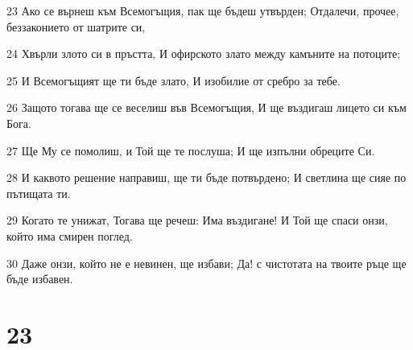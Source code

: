 \par 23 Ако се върнеш към Всемогъщия, пак ще бъдеш утвърден; Отдалечи, прочее, беззаконието от шатрите си,
\par 24 Хвърли злото си в пръстта, И офирското злато между камъните на потоците;
\par 25 И Всемогъщият ще ти бъде злато, И изобилие от сребро за тебе.
\par 26 Защото тогава ще се веселиш във Всемогъщия, И ще въздигаш лицето си към Бога.
\par 27 Ще Му се помолиш, и Той ще те послуша; И ще изпълни обреците Си.
\par 28 И каквото решение направиш, ще ти бъде потвърдено; И светлина ще сияе по пътищата ти.
\par 29 Когато те унижат, Тогава ще речеш: Има въздигане! И Той ще спаси онзи, който има смирен поглед.
\par 30 Даже онзи, който не е невинен, ще избави; Да! с чистотата на твоите ръце ще бъде избавен.

\chapter{23}

